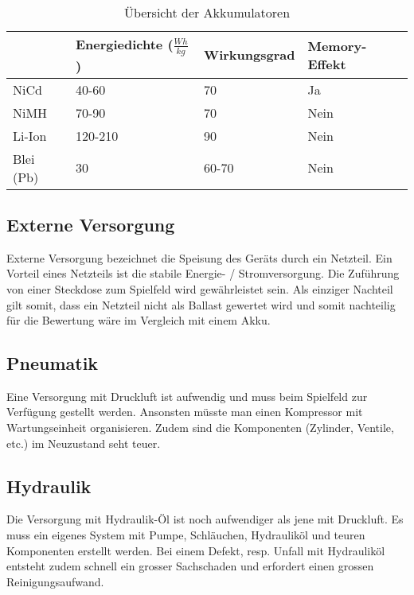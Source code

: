 \begin{table}[h!]
	\begin{tabular}{|p{1.5cm}|p{3.4cm}|p{2.6cm}|p{2.8cm}|} \hline
		          &\textbf{Energiedichte} ($\frac{Wh}{kg}$)  & \textbf{Wirkungsgrad} & \textbf{Memory-Effekt}\\ \hline
		NiCd      & 40-60                                    & 70                    & Ja \\ \hline
		NiMH      & 70-90                                    & 70                    & Nein  \\ \hline
		Li-Ion    & 120-210                                  & 90                    & Nein \\ \hline
		Blei (Pb) & 30                                       & 60-70                 & Nein \\ \hline
	\end{tabular}
	\centering
	\caption{Übersicht der Akkumulatoren}
	\label{tab:UebersichtAkku} 
\end{table}

\subsection{Externe Versorgung}
Externe Versorgung bezeichnet die Speisung des Geräts durch ein Netzteil. Ein Vorteil eines Netzteils ist die stabile Energie- / Stromversorgung. Die Zuführung von einer Steckdose zum Spielfeld wird gewährleistet sein. Als einziger Nachteil gilt somit, dass ein Netzteil nicht als Ballast gewertet wird und somit nachteilig für die Bewertung wäre im Vergleich mit einem Akku.

\subsection{Pneumatik}
Eine Versorgung mit Druckluft ist aufwendig und muss beim Spielfeld zur Verfügung gestellt werden. Ansonsten müsste man einen Kompressor mit Wartungseinheit organisieren. Zudem sind die Komponenten (Zylinder, Ventile, etc.) im Neuzustand seht teuer.

\subsection{Hydraulik}
Die Versorgung mit Hydraulik-Öl ist noch aufwendiger als jene mit Druckluft. Es muss ein eigenes System mit Pumpe, Schläuchen, Hydrauliköl und teuren Komponenten erstellt werden. Bei einem Defekt, resp. Unfall mit Hydrauliköl entsteht zudem schnell ein grosser Sachschaden und erfordert einen grossen Reinigungsaufwand. 

